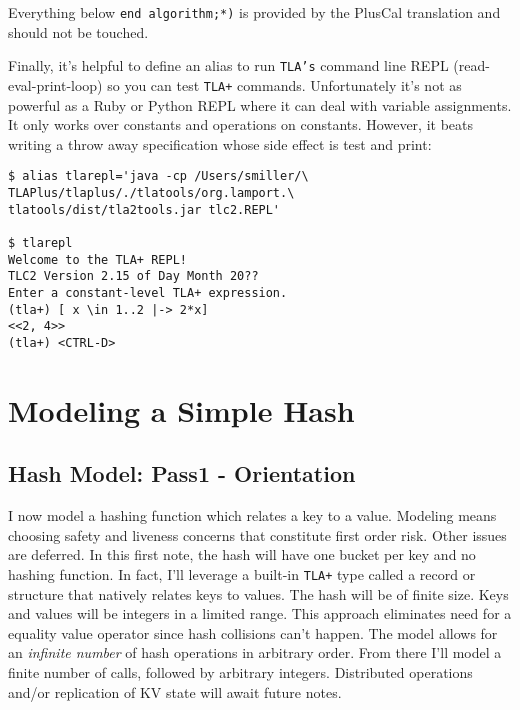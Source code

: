 \documentclass[twocolumn]{article}
\begin{document}
\noindent Everything below \texttt{end algorithm;*)} is provided by the PlusCal translation and should not be touched.

Finally, it's helpful to define an alias to run \texttt{TLA's} command line REPL (read-eval-print-loop) so you can test \texttt{TLA+} commands. Unfortunately it's not as powerful as a Ruby or Python REPL where it can deal with variable assignments. It only works over constants and operations on constants. However, it beats writing a throw away specification whose side effect is test and print: 

\begin{verbatim}
$ alias tlarepl='java -cp /Users/smiller/\
TLAPlus/tlaplus/./tlatools/org.lamport.\
tlatools/dist/tla2tools.jar tlc2.REPL'

$ tlarepl
Welcome to the TLA+ REPL!
TLC2 Version 2.15 of Day Month 20??
Enter a constant-level TLA+ expression.
(tla+) [ x \in 1..2 |-> 2*x]
<<2, 4>>
(tla+) <CTRL-D>
\end{verbatim}

\section{Modeling a Simple Hash}

\subsection{Hash Model: Pass1 - Orientation}
I now model a hashing function which relates a key to a value. Modeling means choosing safety and liveness concerns that constitute first order risk. Other issues are deferred. In this first note, the hash will have one bucket per key and no hashing function. In fact, I'll leverage a built-in \texttt{TLA+} type called a record or structure that natively relates keys to values. The hash will be of finite size. Keys and values will be integers in a limited range. This approach eliminates need for a equality value operator since hash collisions can't happen. The model allows for an \emph{infinite number} of hash operations in arbitrary order. From there I'll model a finite number of calls, followed by arbitrary integers. Distributed operations and/or replication of KV state will await future notes.
\end{document}
